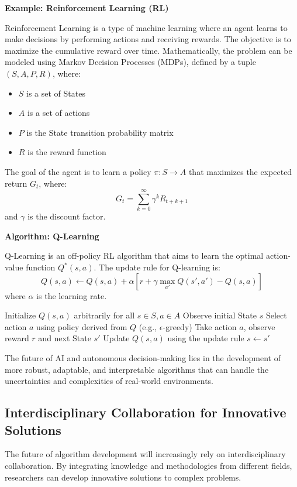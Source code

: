 \documentclass[12pt]{book} %
\begin{document}
\textbf{Example: Reinforcement Learning (RL)}

Reinforcement Learning is a type of machine learning where an agent learns to make decisions by performing actions and receiving rewards. The objective is to maximize the cumulative reward over time. Mathematically, the problem can be modeled using Markov Decision Processes (MDPs), defined by a tuple \((S, A, P, R)\), where:
\begin{itemize}
    \item \(S\) is a set of States
    \item \(A\) is a set of actions
    \item \(P\) is the State transition probability matrix
    \item \(R\) is the reward function
\end{itemize}

The goal of the agent is to learn a policy \(\pi: S \to A\) that maximizes the expected return \(G_t\), where:
\[
G_t = \sum_{k=0}^{\infty} \gamma^k R_{t+k+1}
\]
and \(\gamma\) is the discount factor.

\textbf{Algorithm: Q-Learning}

Q-Learning is an off-policy RL algorithm that aims to learn the optimal action-value function \(Q^*(s, a)\). The update rule for Q-learning is:
\[
Q(s, a) \leftarrow Q(s, a) + \alpha \left[ r + \gamma \max_{a'} Q(s', a') - Q(s, a) \right]
\]
where \(\alpha\) is the learning rate.
\FloatBarrier
\begin{algorithm}
\caption{Q-Learning Algorithm}
\begin{algorithmic}[1]
\State Initialize \(Q(s, a)\) arbitrarily for all \(s \in S, a \in A\)
\State Observe initial State \(s\)
        \State Select action \(a\) using policy derived from \(Q\) (e.g., \(\epsilon\)-greedy)
        \State Take action \(a\), observe reward \(r\) and next State \(s'\)
        \State Update \(Q(s, a)\) using the update rule
        \State \(s \leftarrow s'\)
    \EndWhile
\EndFor
\end{algorithmic}
\end{algorithm}
\FloatBarrier
The future of AI and autonomous decision-making lies in the development of more robust, adaptable, and interpretable algorithms that can handle the uncertainties and complexities of real-world environments.

\subsection{Interdisciplinary Collaboration for Innovative Solutions}
The future of algorithm development will increasingly rely on interdisciplinary collaboration. By integrating knowledge and methodologies from different fields, researchers can develop innovative solutions to complex problems.
\end{document}
